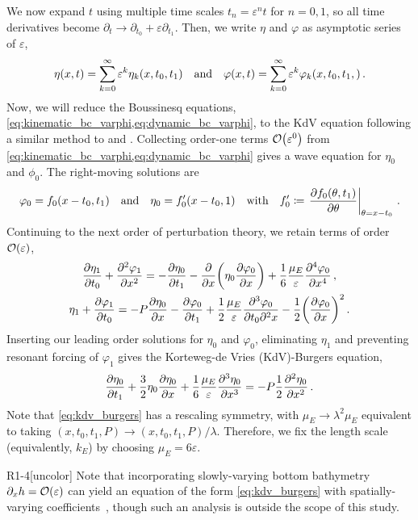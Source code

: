 \documentclass{jfm}
\renewcommand*{\epsilon}{\varepsilon}
\begin{document}
We now expand $t$ using multiple time scales $t_n =
\epsilon^n t$ for $n= 0,1$, so all time derivatives become $\partial_t \to
\partial_{t_0} + \epsilon \partial_{t_1}$.
Then, we write $\eta$ and $\varphi$ as asymptotic series of $\epsilon$,
\begin{equation}
  \eta(x,t) = \sum_{k=0}^{\infty} \epsilon^k
    \eta_{k}(x,t_0,t_1) \qq{and}
  \varphi(x,t) = \sum_{k=0}^{\infty} \epsilon^k
    \varphi_{k}(x,t_0,t_1,) \,.
\end{equation}
Now, we will reduce the Boussinesq equations,
\cref{eq:kinematic_bc_varphi,eq:dynamic_bc_varphi}, to the KdV equation
following a similar method to \citet{mei2005nonlinear} and
\citet{ablowitz2011nonlinear}.
Collecting order-one terms $\order{\epsilon^0}$ from
\cref{eq:kinematic_bc_varphi,eq:dynamic_bc_varphi} gives
a wave equation for $\eta_0$ and $\phi_0$.
The right-moving solutions are
\begin{equation}
  \varphi_0 = f_0(x-t_0,t_1) \qq{and}
  \eta_0 = f'_0(x-t_0,1) \qq{with}
  f_0' \coloneqq \eval{\pdv{f_0(\theta,t_1)}{\theta}}_{\theta = x-t_0} \,.
\end{equation}
Continuing to the next order of perturbation theory, we retain terms of
order $\order{\epsilon}$,
\begin{gather}
    \pdv{\eta_1}{t_0} + \pdv[2]{\varphi_{1}}{x} =
      -\pdv{\eta_0}{t_1} - \pdv{x} \pqty{\eta_0 \pdv{\varphi_0}{x}} +
      \frac{1}{6} \frac{\mu_E}{\epsilon} \pdv[4]{\varphi_0}{x} \,,
  \\
    \eta_1 + \pdv{\varphi_1}{t_0} = -P \pdv{\eta_0}{x} -\pdv{\varphi_0}{t_1}
      + \frac{1}{2} \frac{\mu_E}{\epsilon} \frac{\partial^3 \varphi_0}
        {\partial t_0 \partial^2 x}
      - \frac{1}{2} \pqty{ \pdv{\varphi_0}{x} }^2
  \,.
\end{gather}
Inserting our leading order solutions for $\eta_0$ and $\varphi_0$,
eliminating $\eta_1$ and preventing resonant forcing of $\varphi_1$
gives the Korteweg-de Vries (KdV)-Burgers equation,
\begin{equation}
  \pdv{\eta_0}{t_1} + \frac{3}{2}
    \eta_0 \pdv{\eta_0}{x} + \frac{1}{6} \frac{\mu_E}{\epsilon}
    \pdv[3]{\eta_0}{x} = -P \frac{1}{2} \pdv[2]{\eta_0}{x} \,.
  \label{eq:kdv_burgers}
\end{equation}
Note that \cref{eq:kdv_burgers} has a rescaling symmetry, with $\mu_E
\to \lambda^2 \mu_E$ equivalent to taking $(x,t_0,t_1,P) \to
(x,t_0,t_1,P)/\lambda$.
Therefore, we fix the length scale (equivalently, $k_E$) by choosing
$\mu_E = 6 \epsilon$.
\begin{LineLabel}{R1-4}[uncolor]
Note that incorporating slowly-varying bottom bathymetry $\partial_x h =
\order{\epsilon}$ can yield an equation of the form
\cref{eq:kdv_burgers} with spatially-varying
coefficients~\citep[\eg][]{johnson1972some,ono1972wave}, though such an
analysis is outside the scope of this study.
\end{LineLabel}
\end{document}
